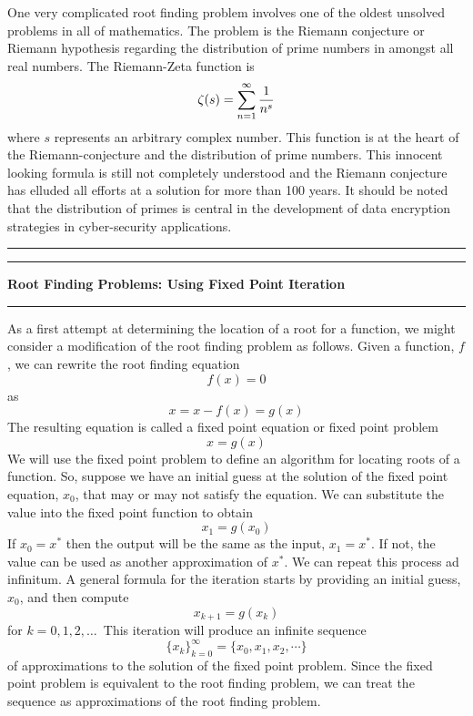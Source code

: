 \documentclass[10pt,fleqn]{article}
\begin{document}
One very complicated root finding problem involves one of the oldest unsolved
problems in all of mathematics. The problem is the Riemann conjecture or Riemann
hypothesis regarding the distribution of prime numbers in amongst all real
numbers. The Riemann-Zeta function is
$$
  \zeta(s) = \sum_{n=1}^\infty {1\over{n^s}}
$$
where $s$ represents an arbitrary complex number. This function is at the heart
of the Riemann-conjecture and the distribution of prime numbers. This innocent
looking formula is still not completely understood and the Riemann conjecture
has elluded all efforts at a solution for more than 100 years. It should be
noted that the distribution of primes is central in the development of data
encryption strategies in cyber-security applications.
\vskip0.1in\hrule\vskip0.1in
\newpage
\vskip0.1in\hrule\vskip0.1in
\noindent
{\bf Root Finding Problems: Using Fixed Point Iteration} 
\vskip0.1in\hrule\vskip0.1in
\noindent
As a first attempt at determining the location of a root for a function, we
might consider a modification of the root finding problem as follows. Given a
function, $f$, we can rewrite the root finding equation
$$
  f(x) = 0
$$
as
$$
  x = x - f(x) = g(x)
$$
The resulting equation is called a fixed point equation or fixed point problem
$$
  x = g(x)
$$
We will use the fixed point problem to define an algorithm for locating roots of
a function. So, suppose we have an initial guess at the solution of the fixed
point equation, $x_0$, that may or may not satisfy the equation. We can
substitute the value into the fixed point function to obtain
$$
  x_1 = g(x_0)
$$
If $x_0=x^*$ then the output will be the same as the input, $x_1=x^*$. If not,
the value can be used as another approximation of $x^*$. We can repeat this
process ad infinitum. A general formula for the iteration starts by providing an
initial guess, $x_0$, and then compute
$$
  x_{k+1} = g(x_k)
$$
for $k=0,1,2,\ldots$\ This iteration will produce an infinite sequence
$$
  \{ x_k \}_{k=0}^\infty = \{ x_0, x_1, x_2, \cdots \}
$$
of approximations to the solution of the fixed point problem. Since the fixed
point problem is equivalent to the root finding problem, we can treat the
sequence as approximations of the root finding problem.
\end{document}
